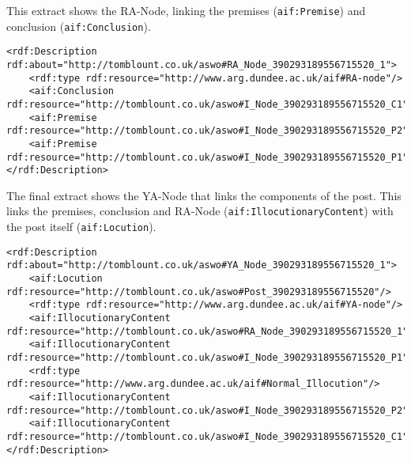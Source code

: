 This extract shows the RA-Node, linking the premises (\texttt{aif:Premise}) and conclusion (\texttt{aif:Conclusion}).
\begin{lstlisting}[breaklines]
<rdf:Description rdf:about="http://tomblount.co.uk/aswo#RA_Node_390293189556715520_1">
    <rdf:type rdf:resource="http://www.arg.dundee.ac.uk/aif#RA-node"/>
    <aif:Conclusion rdf:resource="http://tomblount.co.uk/aswo#I_Node_390293189556715520_C1"/>
    <aif:Premise rdf:resource="http://tomblount.co.uk/aswo#I_Node_390293189556715520_P2"/>
    <aif:Premise rdf:resource="http://tomblount.co.uk/aswo#I_Node_390293189556715520_P1"/>
</rdf:Description>
\end{lstlisting}

The final extract shows the YA-Node that links the components of the post. This links the premises, conclusion and RA-Node (\texttt{aif:IllocutionaryContent}) with the post itself (\texttt{aif:Locution}).
\begin{lstlisting}[breaklines]
<rdf:Description rdf:about="http://tomblount.co.uk/aswo#YA_Node_390293189556715520_1">
    <aif:Locution rdf:resource="http://tomblount.co.uk/aswo#Post_390293189556715520"/>
    <rdf:type rdf:resource="http://www.arg.dundee.ac.uk/aif#YA-node"/>
    <aif:IllocutionaryContent rdf:resource="http://tomblount.co.uk/aswo#RA_Node_390293189556715520_1"/>
    <aif:IllocutionaryContent rdf:resource="http://tomblount.co.uk/aswo#I_Node_390293189556715520_P1"/>
    <rdf:type rdf:resource="http://www.arg.dundee.ac.uk/aif#Normal_Illocution"/>
    <aif:IllocutionaryContent rdf:resource="http://tomblount.co.uk/aswo#I_Node_390293189556715520_P2"/>
    <aif:IllocutionaryContent rdf:resource="http://tomblount.co.uk/aswo#I_Node_390293189556715520_C1"/>
</rdf:Description>
\end{lstlisting}